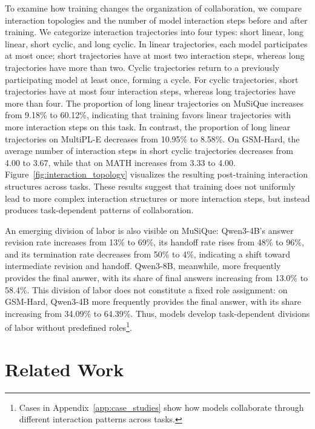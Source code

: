 \documentclass{article} %
\begin{document}
To examine how training changes the organization of collaboration, we compare interaction topologies and the number of model interaction steps before and after training. We categorize interaction trajectories into four types: short linear, long linear, short cyclic, and long cyclic. In linear trajectories, each model participates at most once; short trajectories have at most two interaction steps, whereas long trajectories have more than two. Cyclic trajectories return to a previously participating model at least once, forming a cycle. For cyclic trajectories, short trajectories have at most four interaction steps, whereas long trajectories have more than four. The proportion of long linear trajectories on MuSiQue increases from 9.18\% to 60.12\%, indicating that training favors linear trajectories with more interaction steps on this task. In contrast, the proportion of long linear trajectories on MultiPL-E decreases from 10.95\% to 8.58\%. On GSM-Hard, the average number of interaction steps in short cyclic trajectories decreases from 4.00 to 3.67, while that on MATH increases from 3.33 to 4.00. Figure~\ref{fig:interaction_topology} visualizes the resulting post-training interaction structures across tasks. These results suggest that training does not uniformly lead to more complex interaction structures or more interaction steps, but instead produces task-dependent patterns of collaboration.


An emerging division of labor is also visible on MuSiQue: Qwen3-4B's answer revision rate increases from 13\% to 69\%, its handoff rate rises from 48\% to 96\%, and its termination rate decreases from 50\% to 4\%, indicating a shift toward intermediate revision and handoff. Qwen3-8B, meanwhile, more frequently provides the final answer, with its share of final answers increasing from 13.0\% to 58.4\%. This division of labor does not constitute a fixed role assignment: on GSM-Hard, Qwen3-4B more frequently provides the final answer, with its share increasing from 34.09\% to 64.39\%. Thus, models develop task-dependent divisions of labor without predefined roles\footnote{Cases in Appendix~\ref{app:case_studies} show how models collaborate through different interaction patterns across tasks.}.



\section{Related Work}
\label{sec:related_work}

\vspace{-1em}
\end{document}

